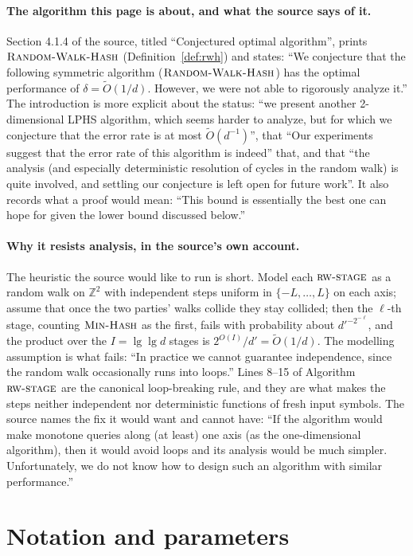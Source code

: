 \documentclass{conjura-conjecture}
\newcommand{\Z}{\mathbb{Z}}
\newcommand{\Ot}{\widetilde{O}}
\newcommand{\MinHash}{\textsc{Min-Hash}}
\newcommand{\rwstage}{\textsc{rw-stage}}
\newcommand{\RWH}{\textsc{Random-Walk-Hash}}
\begin{document}
\paragraph{The algorithm this page is about, and what the source says
  of it.}
Section 4.1.4 of the source, titled ``Conjectured optimal algorithm'',
prints $\RWH$ (Definition~\ref{def:rwh}) and states: ``We conjecture
that the following symmetric algorithm ($\RWH$) has the optimal
performance of $\delta = \Ot(1/d)$. However, we were not able to
rigorously analyze it.'' The introduction is more explicit about the
status: ``we present another 2-dimensional LPHS algorithm, which seems
harder to analyze, but for which we conjecture that the error rate is at
most $\Ot(d^{-1})$'', that ``Our experiments suggest that the error rate
of this algorithm is indeed'' that, and that ``the analysis (and
especially deterministic resolution of cycles in the random walk) is
quite involved, and settling our conjecture is left open for future
work''. It also records what a proof would mean: ``This bound is
essentially the best one can hope for given the lower bound discussed
below.''

\paragraph{Why it resists analysis, in the source's own account.}
The heuristic the source would like to run is short. Model each
$\rwstage$ as a random walk on $\Z^{2}$ with independent steps uniform
in $\{-L, \dots, L\}$ on each axis; assume that once the two parties'
walks collide they stay collided; then the $\ell$-th stage,
counting $\MinHash$ as the first, fails with probability about
$d'^{-2^{-\ell}}$, and the product over the
$I = \lg\lg d$ stages is $2^{O(I)}/d' = \Ot(1/d)$. The modelling
assumption is what fails: ``In practice we cannot guarantee
independence, since the random walk occasionally runs into loops.''
Lines 8--15 of Algorithm~$\rwstage$ are the canonical loop-breaking
rule, and they are what makes the steps neither independent nor
deterministic functions of fresh input symbols. The source names the fix
it would want and cannot have: ``If the algorithm would make monotone
queries along (at least) one axis (as the one-dimensional algorithm),
then it would avoid loops and its analysis would be much simpler.
Unfortunately, we do not know how to design such an algorithm with
similar performance.''

\section{Notation and parameters}\label{sec:notation}
\end{document}
